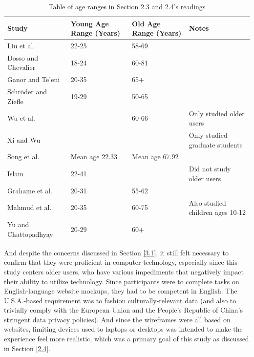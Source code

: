 \documentclass[12pt,twoside]{reedthesis}
\begin{document}
        \begin{table}[h!]
            \centering
            \begin{tabular}{| p{3.5cm} | p{3.5cm} | p{3.5cm} | p{3.5cm} |}
                \hline
                 Study & Young Age Range (Years) & Old Age Range (Years) & Notes\\
                 \hline
                 Liu et al.~\cite{liu_study_2023} & 22-25 & 58-69 & \\
                 \hline
                 Dosso and Chevalier \cite{dosso_how_2021} & 18-24 & 60-81 & \\
                 \hline
                 Ganor and Te'eni \cite{ganor_designing_nodate} & 20-35 & 65+ &\\
                 \hline Schröder and Ziefle \cite{schroder_effects_2008} & 19-29 & 50-65 & \\
                 \hline
                 Wu et al.~\cite{wu_how_2022} & & 60-66 & Only studied older users\\
                 \hline
                 Xi and Wu \cite{xi_influence_2018} & & & Only studied graduate students\\
                 \hline 
                 Song et al.~\cite{song_developing_2024} & Mean age 22.33 & Mean age 67.92 & \\
                 \hline
                 Islam \cite{islam_exploring_2015} & 22-41 & & Did not study older users\\
                 \hline
                 Grahame et al.~\cite{grahame_age_2004} & 20-31 & 55-62 &\\
                 \hline
                 Mahmud et al.~\cite{mahmud_learning_2020} & 20-35 & 60-75 & Also studied children ages 10-12\\
                 \hline
                 Yu and Chattopadhyay \cite{yu_reducing_2024} & 20-29 & 60+ &\\
                 \hline
            \end{tabular}
            \caption{Table of age ranges in Section 2.3 and 2.4's readings}
            \label{agetab}
        \end{table}
        
    And despite the concerns discussed in Section \ref{3.1}, it still felt necessary to confirm that they were proficient in computer technology, especially since this study centers older users, who have various impediments that negatively impact their ability to utilize technology. Since participants were to complete tasks on English-language website mockups, they had to be competent in English. The U.S.A.-based requirement was to fashion culturally-relevant data (and also to trivially comply with the European Union and the People's Republic of China's stringent data privacy policies). And since the wireframes were all based on websites, limiting devices used to laptops or desktops was intended to make the experience feel more realistic, which was a primary goal of this study as discussed in Section \ref{2.4}.
\end{document}
